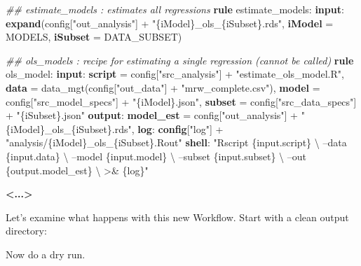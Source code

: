 \documentclass[]{book}
\newenvironment{Shaded}{\begin{snugshade}}{\end{snugshade}}
\newcommand{\KeywordTok}[1]{\textcolor[rgb]{0.13,0.29,0.53}{\textbf{{#1}}}}
\newcommand{\StringTok}[1]{\textcolor[rgb]{0.31,0.60,0.02}{{#1}}}
\newcommand{\CommentTok}[1]{\textcolor[rgb]{0.56,0.35,0.01}{\textit{{#1}}}}
\newcommand{\NormalTok}[1]{{#1}}
\theoremstyle{definition}
\theoremstyle{definition}
\theoremstyle{definition}
\theoremstyle{remark}
\begin{document}
\begin{Shaded}
\begin{Highlighting}[]
\CommentTok{## estimate_models    : estimates all regressions}
\KeywordTok{rule} \NormalTok{estimate_models:}
    \KeywordTok{input}\NormalTok{:}
        \KeywordTok{expand}\NormalTok{(config[}\StringTok{"out_analysis"}\NormalTok{] + }\StringTok{"\{iModel\}_ols_\{iSubset\}.rds"}\NormalTok{,}
                    \KeywordTok{iModel} \NormalTok{= MODELS,}
                    \KeywordTok{iSubset} \NormalTok{= DATA_SUBSET)}

\CommentTok{## ols_models         : recipe for estimating a single regression (cannot be called)}
\KeywordTok{rule} \NormalTok{ols_model:}
    \KeywordTok{input}\NormalTok{:}
        \KeywordTok{script} \NormalTok{= config[}\StringTok{"src_analysis"}\NormalTok{] + }\StringTok{"estimate_ols_model.R"}\NormalTok{,}
        \KeywordTok{data}   \NormalTok{= data_mgt(config[}\StringTok{"out_data"}\NormalTok{] + }\StringTok{"mrw_complete.csv"}\NormalTok{),}
        \KeywordTok{model}  \NormalTok{= config[}\StringTok{"src_model_specs"}\NormalTok{] + }\StringTok{"\{iModel\}.json"}\NormalTok{,}
        \KeywordTok{subset} \NormalTok{= config[}\StringTok{"src_data_specs"}\NormalTok{]  + }\StringTok{"\{iSubset\}.json"}
    \KeywordTok{output}\NormalTok{:}
        \KeywordTok{model_est} \NormalTok{= config[}\StringTok{"out_analysis"}\NormalTok{] + }\StringTok{"\{iModel\}_ols_\{iSubset\}.rds"}\NormalTok{,}
    \KeywordTok{log}\NormalTok{:}
        \KeywordTok{config}\NormalTok{[}\StringTok{"log"}\NormalTok{] + }\StringTok{"analysis/\{iModel\}_ols_\{iSubset\}.Rout"}
    \KeywordTok{shell}\NormalTok{:}
        \StringTok{"Rscript \{input.script\} \textbackslash{}}
\StringTok{            --data \{input.data\} \textbackslash{}}
\StringTok{            --model \{input.model\} \textbackslash{}}
\StringTok{            --subset \{input.subset\} \textbackslash{}}
\StringTok{            --out \{output.model_est\} \textbackslash{}}
\StringTok{            >& \{log\}"}

\KeywordTok{<...>}
\end{Highlighting}
\end{Shaded}

Let's examine what happens with this new Workflow. Start with a clean
output directory:

\begin{Shaded}
\end{Shaded}

Now do a dry run.
\end{document}
